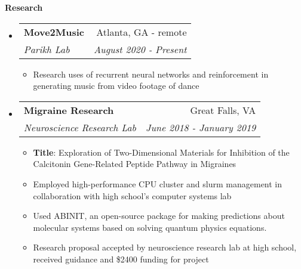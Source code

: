 \documentclass[letterpaper,10pt]{article}
\makeatletter
\newcommand{\resitem}[1]{\item #1 \vspace{-3.5pt}}
\newcommand{\resheading}[1]{{\large \colorbox{mygrey}{\begin{minipage}{\textwidth}{\textbf{#1 \vphantom{p\^{E}}}}\end{minipage}}}}
\newcommand{\ressubheading}[4]{
\begin{tabular*}{7.0in}{l@{\extracolsep{\fill}}r}
		\textbf{#1} & #2 \\
		\textit{#3} & \textit{#4} \\
\end{tabular*}\vspace{-6pt}}
\makeatother
\begin{document}

\resheading{Research}
\begin{itemize}
\item
    \ressubheading{Move2Music}{Atlanta, GA - remote}{Parikh Lab}{August 2020 - Present}
    \begin{itemize}
        \resitem{Research uses of recurrent neural networks and reinforcement in generating music from video footage of dance}
    \end{itemize}
\item
	\ressubheading{Migraine Research}{Great Falls, VA}{Neuroscience Research Lab}{June 2018 - January 2019}
	\begin{itemize}
		\resitem{\textbf{Title}: Exploration of Two-Dimensional Materials for Inhibition of the Calcitonin Gene-Related Peptide Pathway in Migraines}
	    \resitem{Employed high-performance CPU cluster and slurm management in collaboration with high school's computer systems lab}
	    \resitem{Used ABINIT, an open-source package for making predictions about molecular systems based on solving quantum physics equations.}
	    \resitem{Research proposal accepted by neuroscience research lab at high school, received guidance and \$2400 funding for project}
	\end{itemize}
	
\end{itemize}
\end{document}
